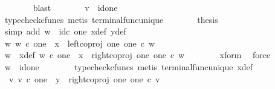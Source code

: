 \begin{isabellebody}
\ \ \ \ \ \ \isamarkupfalse%
\ blast\isanewline
\ \ \ \ \isamarkupfalse%
\ \isamarkupfalse%
\ {\isachardoublequoteopen}v\ {\isacharequal}{\kern0pt}\ id{\isacharparenleft}{\kern0pt}one{\isacharparenright}{\kern0pt}{\isachardoublequoteclose}\isanewline
\ \ \ \ \ \ \isamarkupfalse%
\ {\isacharparenleft}{\kern0pt}typecheck{\isacharunderscore}{\kern0pt}cfuncs{\isacharcomma}{\kern0pt}\ metis\ terminal{\isacharunderscore}{\kern0pt}func{\isacharunderscore}{\kern0pt}unique{\isacharparenright}{\kern0pt}\isanewline
\ \ \ \ \isamarkupfalse%
\ \isamarkupfalse%
\ {\isacharquery}{\kern0pt}thesis\isanewline
\ \ \ \ \ \ \isamarkupfalse%
\ {\isacharparenleft}{\kern0pt}simp\ add{\isacharcolon}{\kern0pt}\ {\isacartoucheopen}w\ {\isacharequal}{\kern0pt}\ id\isactrlsub c\ one{\isacartoucheclose}\ x{\isacharunderscore}{\kern0pt}def\ y{\isacharunderscore}{\kern0pt}def{\isacharparenright}{\kern0pt}\isanewline
\ \ \isamarkupfalse%
\isanewline
\ \ \ \ \isamarkupfalse%
\ {\isachardoublequoteopen}{\isasymnexists}w{\isachardot}{\kern0pt}\ w\ {\isasymin}\isactrlsub c\ one\ {\isasymand}\ x\ {\isacharequal}{\kern0pt}\ left{\isacharunderscore}{\kern0pt}coproj\ one\ one\ {\isasymcirc}\isactrlsub c\ w{\isachardoublequoteclose}\isanewline
\ \ \ \ \isamarkupfalse%
\ \isamarkupfalse%
\ w\ \ x{\isacharunderscore}{\kern0pt}def{\isacharcolon}{\kern0pt}\ {\isachardoublequoteopen}w\ {\isasymin}\isactrlsub c\ one\ {\isasymand}\ x\ {\isacharequal}{\kern0pt}\ right{\isacharunderscore}{\kern0pt}coproj\ one\ one\ {\isasymcirc}\isactrlsub c\ w{\isachardoublequoteclose}\isanewline
\ \ \ \ \ \ \isamarkupfalse%
\ x{\isacharunderscore}{\kern0pt}form\ \isamarkupfalse%
\ force\isanewline
\ \ \ \ \isamarkupfalse%
\ \isamarkupfalse%
\ {\isachardoublequoteopen}w\ {\isacharequal}{\kern0pt}\ id{\isacharparenleft}{\kern0pt}one{\isacharparenright}{\kern0pt}{\isachardoublequoteclose}\isanewline
\ \ \ \ \ \ \isamarkupfalse%
\ {\isacharparenleft}{\kern0pt}typecheck{\isacharunderscore}{\kern0pt}cfuncs{\isacharcomma}{\kern0pt}\ metis\ terminal{\isacharunderscore}{\kern0pt}func{\isacharunderscore}{\kern0pt}unique\ x{\isacharunderscore}{\kern0pt}def{\isacharparenright}{\kern0pt}\isanewline
\ \ \ \ \isamarkupfalse%
\ {\isachardoublequoteopen}{\isasymexists}\ v{\isachardot}{\kern0pt}\ v\ {\isasymin}\isactrlsub c\ one\ {\isasymand}\ y\ {\isacharequal}{\kern0pt}\ right{\isacharunderscore}{\kern0pt}coproj\ one\ one\ {\isasymcirc}\isactrlsub c\ v{\isachardoublequoteclose}\isanewline

\end{isabellebody}
